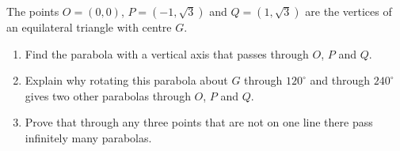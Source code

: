 The points $O=(0,0)$, $P=\left(-1,\sqrt3\right)$ and $Q=\left(1,\sqrt3\right)$ are the vertices of an equilateral triangle with centre $G$.
\begin{enumerate}
\item[(a)] Find the parabola with a vertical axis that passes through $O$, $P$ and $Q$.
\item[(b)] Explain why rotating this parabola about $G$ through $120^\circ$ and through $240^\circ$ gives two other parabolas through $O$, $P$ and $Q$.
\item[(c)] Prove that through any three points that are not on one line there pass infinitely many parabolas.
\end{enumerate}
